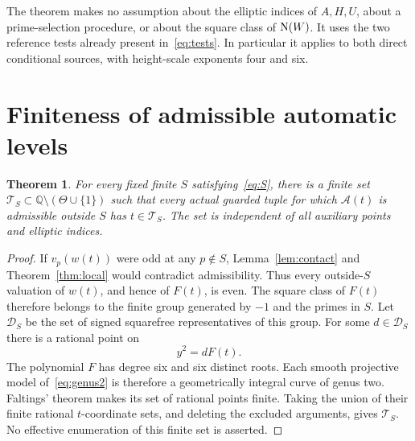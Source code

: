 \documentclass[11pt,a4paper]{article}
\newtheorem{theorem}{Theorem}[section]
\newcommand{\Q}{\mathbb Q}\newcommand{\Z}{\mathbb Z}
\begin{document}
The theorem makes no assumption about the elliptic indices of
$A,H,U$, about a prime-selection procedure, or about the square
class of $\operatorname{N}(W)$. It uses the two reference tests already present
in~\eqref{eq:tests}. In particular it applies to both direct conditional
sources, with height-scale exponents four and six.

\section{Finiteness of admissible automatic levels}

\begin{theorem}\label{thm:finitearguments}
For every fixed finite $S$ satisfying~\eqref{eq:S}, there is a finite
set $\mathcal T_S\subset\Q\setminus(\Theta\cup\{1\})$ such that
every actual guarded tuple for which $\mathcal A(t)$ is admissible
outside $S$ has $t\in\mathcal T_S$.
The set is independent of all auxiliary points and elliptic indices.
\end{theorem}
\begin{proof}
If $v_p(w(t))$ were odd at any $p\notin S$,
Lemma~\ref{lem:contact} and Theorem~\ref{thm:local} would contradict
admissibility. Thus every outside-$S$ valuation of $w(t)$, and hence
of $F(t)$, is even.
The square class of $F(t)$ therefore belongs to the finite group
generated by $-1$ and the primes in $S$. Let $\mathcal D_S$ be the
set of signed squarefree representatives of this group. For some
$d\in\mathcal D_S$ there is a rational point on
\begin{equation}\label{eq:genus2}
                              y^2=dF(t).
\end{equation}
The polynomial $F$ has degree six and six distinct roots. Each
smooth projective model of~\eqref{eq:genus2} is therefore a
geometrically integral curve of genus two. Faltings' theorem
\cite[Satz~7]{Faltings} makes its set of rational points finite.
Taking the union of their finite rational $t$-coordinate sets,
and deleting the excluded arguments, gives $\mathcal T_S$.
No effective enumeration of this finite set is asserted.
\end{proof}
\end{document}
